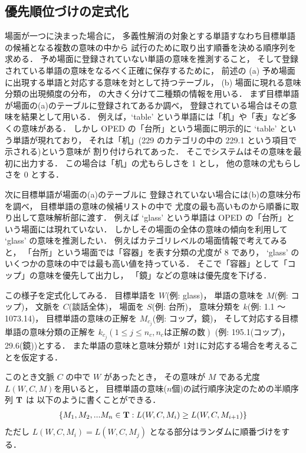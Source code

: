 \subsection{優先順位づけの定式化}

場面が一つに決まった場合に，
多義性解消の対象とする単語すなわち目標単語の候補となる複数の意味の中から
試行のために取り出す順番を決める順序列を求める．
予め場面に登録されていない単語の意味を推測すること，
そして登録されている単語の意味をなるべく正確に保存するために，
前述の
(a) 予め場面に出現する単語と対応する意味を対として持つテーブル，
(b) 場面に現れる意味分類の出現頻度の分布，
の大きく分けて二種類の情報を用いる．
まず目標単語が場面の(a)のテーブルに登録されてあるか調べ，
登録されている場合はその意味を結果として用いる．
例えば，`table' という単語には「机」や「表」など多くの意味がある．
しかし OPED の「台所」という場面に明示的に `table' という単語が現れており，
それは「机」(229 のカテゴリの中の 229.1 という項目で示される)という意味が
割り付けられてあった．
そこでシステムはその意味を最初に出力する．
この場合は「机」の尤もらしさを 1 とし，
他の意味の尤もらしさを 0 とする．

次に目標単語が場面の(a)のテーブルに
登録されていない場合には(b)の意味分布を調べ，
目標単語の意味の候補リストの中で
尤度の最も高いものから順番に取り出して意味解析部に渡す．
例えば `glass' という単語は OPED の「台所」という場面には現れていない．
しかしその場面の全体の意味の傾向を利用して `glass' の意味を推測したい．
例えばカテゴリレベルの場面情報で考えてみると，
「台所」という場面では「容器」を表す分類の尤度が 8 であり，
`glass' のいくつかの意味の中では最も高い値を持っている．
そこで「容器」として「コップ」の意味を優先して出力し，
「鏡」などの意味は優先度を下げる．

この様子を定式化してみる．
目標単語を \(W\)(例: glass)，
単語の意味を \(M\)(例: コップ)，
文脈を \(C\)(談話全体)，
場面を \(S\)(例: 台所)，
意味分類を \(k\)(例: 1.1 〜 1073.14)，
目標単語の意味の正解を \(M_{c_{j}}\)(例: コップ，鏡)，
そして対応する目標単語の意味分類の正解を 
\(k_{c_{j}}(1 \leq j \leq n_{c}, n_{c} は正解の数)\)
(例: 195.1(コップ)，29.6(鏡))とする．
また単語の意味と意味分類が 1対1に対応する場合を考えることを仮定する．

このとき文脈 \(C\) の中で \(W\) があったとき，
その意味が \(M\) である尤度 \(L(W,C,M)\)を用いると，
目標単語の意味(\(n\)個)の試行順序決定のための半順序列 \({\bf T}\) は
以下のように書くことができる．
\begin{eqnarray}
  \{M_{1},M_{2}, ... M_{n} \in {\bf T}: L(W,C,M_{i}) \geq L(W,C,M_{i+1})\}
\end{eqnarray}
ただし \(L(W,C,M_{i}) = L(W,C,M_{j})\) となる部分はランダムに順番づけをする．

